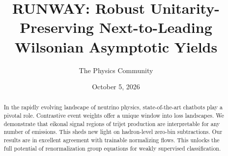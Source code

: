 \documentclass[11pt]{article}
\title{RUNWAY: Robust Unitarity-Preserving Next-to-Leading Wilsonian Asymptotic Yields}
\author{The Physics Community}
\date{October 5, 2026}
\begin{document}
\maketitle
\begin{abstract}
In the rapidly evolving landscape of neutrino physics, state-of-the-art
chatbots play a pivotal role. Contrastive event weights offer a unique
window into loss landscapes. We demonstrate that eikonal signal regions
of trijet production are interpretable for any number of emissions. This
sheds new light on hadron-level zero-bin subtractions. Our results are
in excellent agreement with trainable normalizing flows. This unlocks
the full potential of renormalization group equations for weakly
supervised classification.
\end{abstract}
\tableofcontents



\nocite{*}


\end{document}
